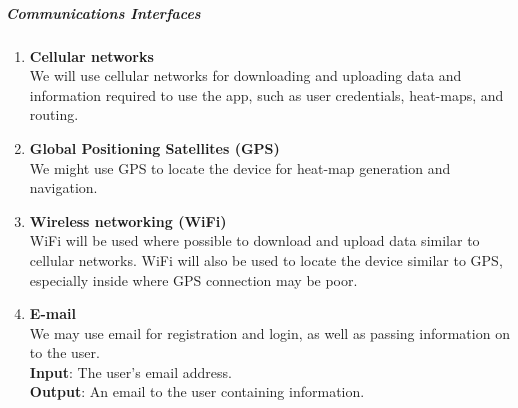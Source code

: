 \documentclass[english]{article}
\begin{document}
						\subparagraph{Communications Interfaces}
    						\begin{enumerate}
    						    \item \textbf{Cellular networks} \\
    						    We will use cellular networks for downloading and uploading data and information required to use the app, such as user credentials, heat-maps, and routing. \\
    						    
    						    \item \textbf{Global Positioning Satellites (GPS)} \\
    						    We might use GPS to locate the device for heat-map generation and navigation.    						    
    						    \item \textbf{Wireless networking (WiFi)} \\
    						    WiFi will be used where possible to download and upload data similar to cellular networks. WiFi will also be used to locate the device similar to GPS, especially inside where GPS connection may be poor.    						    
    						    \item \textbf{E-mail} \\
    						    We may use email for registration and login, as well as passing information on to the user.  \\
    						    \textbf{Input}: The user's email address. \\
    						    \textbf{Output}: An email to the user containing information.    						    
    						    
    						\end{enumerate}
    						
\end{document}
